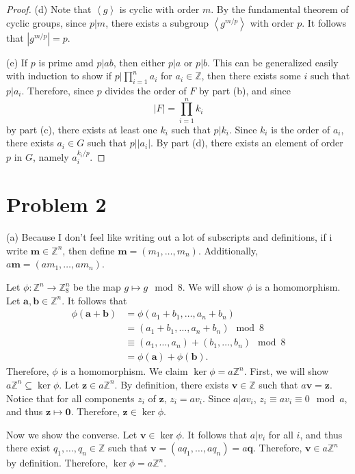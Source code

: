 \documentclass[11pt, letterpaper]{report}
\begin{document}
\begin{proof}
(d) Note that $\left<g \right>$ is cyclic with order $m$. By the fundamental theorem of cyclic groups, since $p|m$, there exists a subgroup $\left<g ^{m / p} \right>$ with order $p$. It follows that $\left| g^{m /p} \right| =p$.

(e) If $p$ is prime amd $p|ab$, then either $p|a$ or $p|b$. This can be generalized easily with induction to show if $p|\prod_{i=1}^{n} a_i $ for $a_i\in\mathbb{Z}$, then there exists some $i$ such that $p|a_i$. Therefore, since $p$ divides the order of $F$ by part (b), and since
\[
	\left| F \right| =\prod_{i=1}^{n} k_i 
\]
by part (c), there exists at least one $k_i$ such that $p|k_i$. Since $k_i$ is the order of $a_i$, there exists $a_i\in G$ such that $p | \left| a_i \right| $. By part (d), there exists an element of order $p$ in $G$, namely $a_i^{k_i / p}$.
\end{proof}
\section*{Problem 2}
(a) Because I don't feel like writing out a lot of subscripts and definitions, if i write $\mathbf{m}\in\mathbb{Z}^n$, then define $\mathbf{m}=\left( m_1, \dots, m_n \right) $. Additionally, $a \mathbf{m} = \left( am_1, \dots, am_n  \right) $.

Let $\phi : \mathbb{Z}^n \to \mathbb{Z}_8^n$ be the map $g\mapsto g\mod{8}$. We will show $\phi $ is a homomorphism. Let $\mathbf{a},\mathbf{b}\in\mathbb{Z}^n$. It follows that
\begin{align*}
	\phi (\mathbf{a}+\mathbf{b})&=\phi \left( a_1+b_1, \dots, a_n +b_n \right) \\
				    &=\left( a_1+b_1, \ldots, a_n + b_n \right) \mod{8}\\
				    &\equiv \left( a_1, \dots, a_n  \right) +\left( b_1, \dots, b_n  \right) \mod{8}\\
				    &=\phi (\mathbf{a})+\phi (\mathbf{b})
.\end{align*}
Therefore, $\phi $ is a homomorphism. We claim $\ker \phi =a\mathbb{Z}^n$. First, we will show $a\mathbb{Z}^n \subseteq \ker \phi $. Let $\mathbf{z}\in a\mathbb{Z}^n$. By definition, there exists $\mathbf{v}\in\mathbb{Z}$ such that $a \mathbf{v}=\mathbf{z}$. Notice that for all components $z_i$ of $\mathbf{z}$, $z_i=av_i$. Since $a|av_i$, $z_i\equiv av_i\equiv 0\mod{a}$, and thus $\mathbf{z}\mapsto \mathbf{0}$. Therefore, $\mathbf{z}\in \ker \phi $.

Now we show the converse. Let $\mathbf{v}\in \ker \phi $. It follows that $a|v_i$ for all $i$, and thus there exist $q_1, \dots, q_n \in\mathbb{Z}$ such that $\mathbf{v}=\left( aq_1, \dots, aq_n  \right) =a \mathbf{q}$. Therefore, $\mathbf{v}\in a\mathbb{Z}^n$ by definition. Therefore, $\ker \phi = a\mathbb{Z}^n$.
\end{document}

